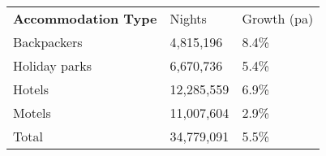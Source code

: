 \begin{tabular}[t]{p{5cm}p{1.3cm}p{1.2cm}}
 \textbf{Accommodation Type} & Nights & Growth (pa) \\ 
 Backpackers &  4,815,196 & 8.4\% \\ 
  Holiday parks &  6,670,736 & 5.4\% \\ 
  Hotels & 12,285,559 & 6.9\% \\ 
  Motels & 11,007,604 & 2.9\% \\ 
  Total & 34,779,091 & 5.5\% \\ 
  \end{tabular}
